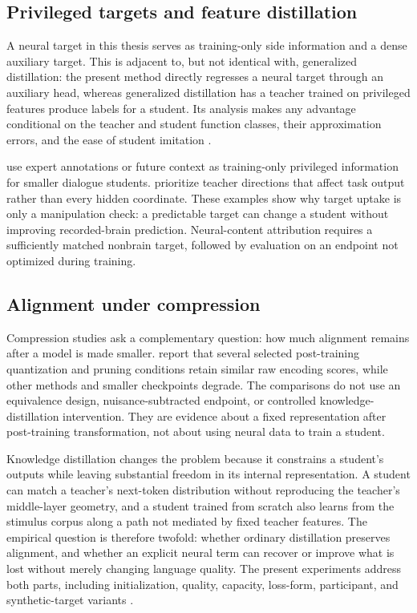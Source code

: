 \subsection{Privileged targets and feature distillation}

A neural target in this thesis serves as training-only side information and a dense auxiliary target.
This is adjacent to, but not identical with, generalized distillation: the present method directly regresses a neural target through an auxiliary head, whereas generalized distillation has a teacher trained on privileged features produce labels for a student.
Its analysis makes any advantage conditional on the teacher and student function classes, their approximation errors, and the ease of student imitation \autocite{lopezpaz2016}.

\textcite{wu2026} use expert annotations or future context as training-only privileged information for smaller dialogue students.
\textcite{saadi2025} prioritize teacher directions that affect task output rather than every hidden coordinate.
These examples show why target uptake is only a manipulation check: a predictable target can change a student without improving recorded-brain prediction.
Neural-content attribution requires a sufficiently matched nonbrain target, followed by evaluation on an endpoint not optimized during training.

\subsection{Alignment under compression}

Compression studies ask a complementary question: how much alignment remains after a model is made smaller.
\textcite{oota2026} report that several selected post-training quantization and pruning conditions retain similar raw encoding scores, while other methods and smaller checkpoints degrade.
The comparisons do not use an equivalence design, nuisance-subtracted endpoint, or controlled knowledge-distillation intervention.
They are evidence about a fixed representation after post-training transformation, not about using neural data to train a student.

Knowledge distillation changes the problem because it constrains a student's outputs while leaving substantial freedom in its internal representation.
A student can match a teacher's next-token distribution without reproducing the teacher's middle-layer geometry, and a student trained from scratch also learns from the stimulus corpus along a path not mediated by fixed teacher features.
The empirical question is therefore twofold: whether ordinary distillation preserves alignment, and whether an explicit neural term can recover or improve what is lost without merely changing language quality.
The present experiments address both parts, including initialization, quality, capacity, loss-form, participant, and synthetic-target variants       .

